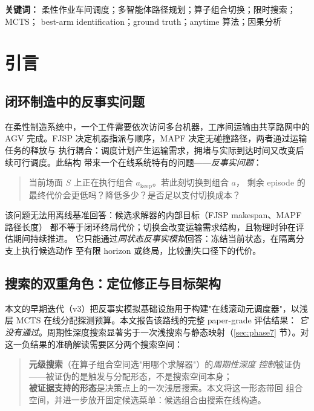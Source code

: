 \documentclass[11pt,a4paper]{article}
\begin{document}
\noindent\textbf{关键词：}
柔性作业车间调度；多智能体路径规划；算子组合切换；限时搜索；MCTS；
best-arm identification；ground truth；anytime 算法；因果分析

\section{引言}
\label{sec:introduction}

\subsection{闭环制造中的反事实问题}

在柔性制造系统中，一个工件需要依次访问多台机器，工序间运输由共享路网中的 AGV
完成。FJSP 决定机器指派与顺序，MAPF 决定无碰撞路径，两者通过运输任务的释放与
执行耦合：调度计划产生运输需求，拥堵与实际到达时间又改变后续可行调度。此结构
带来一个在线系统特有的问题——\emph{反事实问题}：

\begin{quote}
当前场面 $S$ 上正在执行组合 $a_\text{keep}$。若此刻切换到组合 $a$，
剩余 episode 的最终代价会更低吗？降低多少？是否足以支付切换成本？
\end{quote}

该问题无法用离线基准回答：候选求解器的内部目标（FJSP makespan、MAPF 路径长度）
都不等于闭环终局代价；切换会改变运输需求结构，且物理时钟在评估期间持续推进。
它只能通过\emph{同状态反事实模拟}回答：冻结当前状态，在隔离分支上执行候选动作
至有限 horizon 或终局，比较删失口径下的代价。

\subsection{搜索的双重角色：定位修正与目标架构}

本文的早期迭代（v3）把反事实模拟基础设施用于构建"在线滚动元调度器"，以浅层
MCTS 在线分配探测预算。本文报告该路线的完整 paper-grade 评估结果：
\emph{它没有通过}。周期性深度搜索显著劣于一次浅搜索与静态映射（\ref{sec:phase7}
节）。对这一负结果的准确解读需要区分两个搜索空间：

\begin{quote}
\textbf{元级搜索}（在算子组合空间选"用哪个求解器"）的\emph{周期性深度
控制}被证伪——被证伪的是触发与分配形态，不是搜索空间本身；\\[2pt]
\textbf{被证据支持的形态}是决策点上的一次浅层搜索。本文将这一形态带回
组合空间，并进一步放开固定候选菜单：候选组合由搜索在线构造。
\end{quote}
\end{document}

